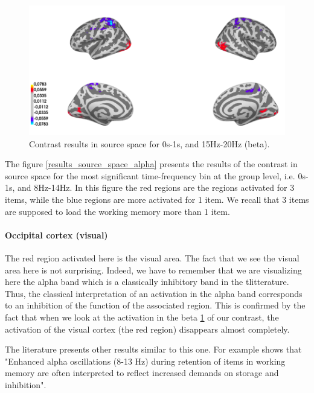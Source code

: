 \begin{figure}[ht]
    \centering
    \includegraphics[width=13cm]{images_report/source/source_results_beta_1s.png}
    \caption[Results of the contrast in the source space.]%
    {Contrast results in source space for 0s-1s, and 15Hz-20Hz (beta).}
    \label{results_source_space_beta}
\end{figure}
 
The figure \ref{results_source_space_alpha} presents the results of the contrast in source space for the most significant time-frequency bin at the group level, i.e. 0s-1s, and 8Hz-14Hz. In this figure the red regions are the regions activated for 3 items, while the blue regions are more activated for 1 item. We recall that 3 items are supposed to load the working memory more than 1 item.

\paragraph{Occipital cortex (visual)}
\label{section:alpha_discussion}
The red region activated here is the visual area. The fact that we see the visual area here is not surprising. Indeed, we have to remember that we are visualizing here the alpha band which is a classically inhibitory band in the tlitterature. Thus, the classical interpretation of an activation in the alpha band corresponds to an inhibition of the function of the associated region. This is confirmed by the fact that when we look at the activation in the beta \ref{results_source_space_beta} of our contrast, the activation of the visual cortex (the red region) disappears almost completely.

The literature presents other results similar to this one. For example \cite{obleser2012adverse} shows that "Enhanced alpha oscillations (8-13 Hz) during retention of items in working memory are often interpreted to reflect increased demands on storage and inhibition".

